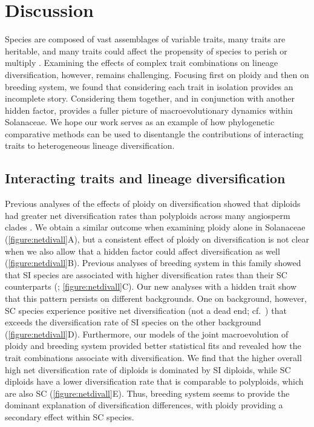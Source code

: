\section{Discussion}

%
Species are composed of vast assemblages of variable traits, many traits are heritable, and many traits could affect the propensity of species to perish or multiply \citep{lewontin_1970}.
Examining the effects of complex trait combinations on lineage diversification, however, remains challenging.
%
Focusing first on ploidy and then on breeding system, we found that considering each trait in isolation provides an incomplete story.
Considering them together, and in conjunction with another hidden factor, provides a fuller picture of macroevolutionary dynamics within Solanaceae.
We hope our work serves as an example of how phylogenetic comparative methods can be used to disentangle the contributions of interacting traits to heterogeneous lineage diversification.

\subsection{Interacting traits and lineage diversification} 

Previous analyses of the effects of ploidy on diversification showed that diploids had greater net diversification rates than polyploids across many angiosperm clades \citep{mayrose_2011, mayrose_2015}. 
We obtain a similar outcome when examining ploidy alone in Solanaceae (\cref{figure:netdivall}A), but a consistent effect of ploidy on diversification is not clear when we also allow that a hidden factor could affect diversification as well (\cref{figure:netdivall}B).
%
Previous analyses of breeding system in this family showed that SI species are associated with higher diversification rates than their SC counterparts (\citealt{goldberg_2010}; \cref{figure:netdivall}C).
Our new analyses with a hidden trait show that this pattern persists on different backgrounds.
One on background, however, SC species experience positive net diversification (\ie not a dead end; cf.\ \citealt{igic_2013}) that exceeds the diversification rate of SI species on the other background (\cref{figure:netdivall}D).
%
Furthermore, our models of the joint macroevolution of ploidy and breeding system provided better statistical fits and revealed how the trait combinations associate with diversification.
We find that the higher overall high net diversification rate of diploids is dominated by SI diploids, while SC diploids have a lower diversification rate that is comparable to polyploids, which are also SC (\cref{figure:netdivall}E).
Thus, breeding system seems to provide the dominant explanation of diversification differences, with ploidy providing a secondary effect within SC species.

